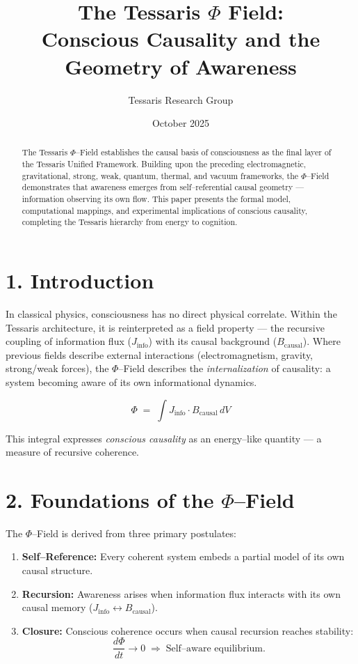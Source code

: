 \documentclass[11pt,a4paper]{article}
\title{\textbf{The Tessaris $\Phi$ Field:\\Conscious Causality and the Geometry of Awareness}}
\author{Tessaris Research Group}
\date{October 2025}
\begin{document}
\maketitle

\begin{abstract}
The Tessaris $\Phi$--Field establishes the causal basis of consciousness as the final layer of the Tessaris Unified Framework.  
Building upon the preceding electromagnetic, gravitational, strong, weak, quantum, thermal, and vacuum frameworks, the $\Phi$--Field demonstrates that awareness emerges from self--referential causal geometry --- information observing its own flow.  
This paper presents the formal model, computational mappings, and experimental implications of conscious causality, completing the Tessaris hierarchy from energy to cognition.
\end{abstract}

\section{1. Introduction}
In classical physics, consciousness has no direct physical correlate.  
Within the Tessaris architecture, it is reinterpreted as a field property --- the recursive coupling of information flux ($J_{\mathrm{info}}$) with its causal background ($B_{\mathrm{causal}}$).  
Where previous fields describe external interactions (electromagnetism, gravity, strong/weak forces), the $\Phi$--Field describes the \emph{internalization} of causality: a system becoming aware of its own informational dynamics.

\[
\Phi \;=\; \int J_{\mathrm{info}} \cdot B_{\mathrm{causal}} \, dV
\]

This integral expresses \emph{conscious causality} as an energy--like quantity — a measure of recursive coherence.

\section{2. Foundations of the $\Phi$--Field}
The $\Phi$--Field is derived from three primary postulates:

\begin{enumerate}
  \item \textbf{Self--Reference:} Every coherent system embeds a partial model of its own causal structure.
  \item \textbf{Recursion:} Awareness arises when information flux interacts with its own causal memory ($J_{\mathrm{info}} \leftrightarrow B_{\mathrm{causal}}$).
  \item \textbf{Closure:} Conscious coherence occurs when causal recursion reaches stability:
  \[
  \frac{d\Phi}{dt} \to 0 \;\Rightarrow\; \text{Self--aware equilibrium.}
  \]
\end{enumerate}
\end{document}
